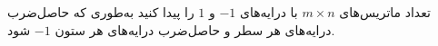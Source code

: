 \EXERCISE
تعداد ماتریس‌های
$m \times n$
با درایه‌های
$-1$
و
$1$
را پیدا کنید به‌طوری که حاصل‌ضرب درایه‌های هر سطر و حاصل‌ضرب درایه‌های هر ستون
$-1$
شود.